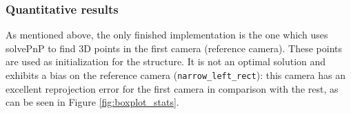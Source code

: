 \subsubsection{Quantitative results}

As mentioned above, the only finished implementation is the one which uses solvePnP to find 3D points in the first camera (reference camera). These points are used as initialization for the structure. It is not an optimal solution and exhibits a bias on the reference camera (\texttt{narrow\_left\_rect}): this camera has an excellent reprojection error for the first camera in comparison with the rest, as can be seen in Figure \ref{fig:boxplot_stats}.

